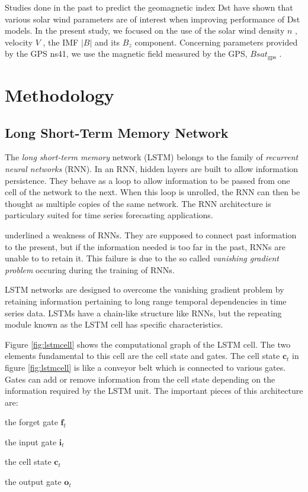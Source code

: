 Studies done in the past to predict the geomagnetic index Dst have shown that various solar wind parameters 
are of interest when improving performance of Dst models. In the present study, we focused on the use 
of the solar wind density  \( n \) , velocity  \( V \) , the IMF \( \vert B \vert  \) and its  \( B_{z} \) component. 
Concerning parameters provided by the GPS ns41, we use the magnetic field measured by the GPS, \( Bsat_{\text{gps}} \) .

\section{Methodology}\label{sec:methodgpnn}


\subsection{Long Short-Term Memory Network}\label{sec:lstmcomponent}

The \emph{long short-term memory} network (LSTM) belongs to the family of \emph{recurrent neural networks} (RNN). 
In an RNN, hidden layers are built to allow information persistence. They behave as a loop to allow information 
to be passed from one cell of the network to the next. When this loop is unrolled, the RNN can then be thought 
as multiple copies of the same network. The RNN architecture is particulary suited for time series forecasting 
applications. 

\citet{hochreiter1991untersuchungen,bengio1994learning} underlined a weakness of RNNs. They are supposed to connect 
past information to the present, but if the information needed is too far in the past, RNNs are unable to to retain it. This failure is due to the so called \emph{vanishing gradient problem} occuring during the training of RNNs. 

LSTM networks are designed to overcome the vanishing gradient problem by retaining information pertaining to long range 
temporal dependencies in time series data. LSTMs have a chain-like structure like RNNs, but the repeating module 
known as the LSTM cell has specific characteristics.

Figure \ref{fig:lstmcell} shows the computational graph of the LSTM cell. The two elements 
fundamental to this cell are the cell state and gates. The cell state $\mathbf{c}_{t}$ in figure \ref{fig:lstmcell} 
is like a conveyor belt which is connected to various gates. Gates can add or remove information from the cell 
state depending on the information required by the LSTM unit. The important pieces of this architecture are: 
\begin{itemize*} 
	\item the forget gate $\mathbf{f}_t$ 
	\item the input gate $\mathbf{i}_t$ 
	\item the cell state $\mathbf{c}_t$ 
	\item the output gate $\mathbf{o}_t$  
\end{itemize*}  

